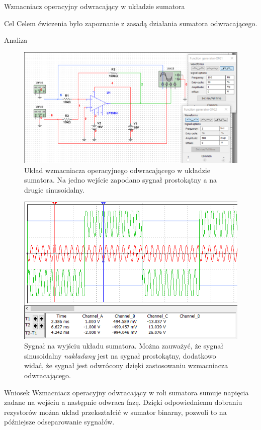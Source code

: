 \documentclass[a4paper]{scrartcl}
\begin{document}
	\begin{section}{Wzmacniacz operacyjny odwracający w układzie sumatora}
		\begin{subsection}{Cel}
			Celem ćwiczenia było zapoznanie z zasadą działania sumatora odwracającego.
		\end{subsection}

		\begin{subsection}{Analiza}
				\begin{figure}[!ht]
				\begin{center}
					\includegraphics[width=0.7\linewidth,scale=2]{04-circuit-4}
					\caption{Układ wzmacniacza operacyjnego odwracającego w układzie sumatora. Na jedno wejście zapodano sygnał prostokątny a na drugie sinusoidalny.}
					\label{fig:circuit-2-circuit-pre-change}
				\end{center}

				\end{figure}

				\begin{figure}[!ht]
					\begin{center}
						\includegraphics[width=.6\linewidth]{04-osc-4}
						\caption{Sygnał na wyjściu układu sumatora. Można zauważyć, że sygnał sinusoidalny \textit{nakładany} jest na sygnał prostokątny, dodatkowo widać, że sygnał jest odwrócony dzięki zastosowaniu wzmacniacza odwracającego.}
					\end{center}
				\end{figure}
		\end{subsection}
		\begin{subsection}{Wniosek}
			Wzmacniacz operacyjny odwracający w roli sumatora sumuje napięcia zadane na wejściu a następnie odwraca fazę. Dzięki odpowiedniemu dobraniu rezystorów można układ przekształcić w sumator binarny, pozwoli to na późniejsze odseparowanie sygnałów.
		\end{subsection}
	\end{section}
\end{document}
